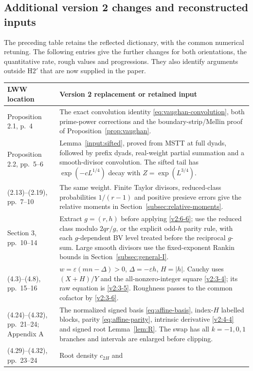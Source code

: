 \documentclass[11pt]{article}
\theoremstyle{definition}
\theoremstyle{remark}
\numberwithin{equation}{section}
\begin{document}
\subsection{Additional version 2 changes and reconstructed inputs}
The preceding table retains the reflected dictionary, with the
common numerical retuning. The following entries give the further
changes for both orientations, the quantitative rate, rough values
and progressions. They also identify arguments outside
$\mathrm H2'$ that are now supplied in the paper.
\small
\begin{longtable}{@{}>{\raggedright\arraybackslash}p{}>{\raggedright\arraybackslash}p{}@{}}
\toprule LWW location & Version 2 replacement or retained input\\\midrule
\endhead
Proposition 2.1, p.~4 & The exact convolution identity
\eqref{eq:vaughan-convolution}, both prime-power corrections and
the boundary-strip/Mellin proof of Proposition~\ref{prop:vaughan}.\\
Proposition 2.2, pp.~5--6 & Lemma~\ref{input:sifted}, proved from
MSTT at full dyads, followed by prefix dyads, real-weight partial
summation and a smooth-divisor convolution. The sifted tail has
$\exp(-cL^{1/4})$ decay with $Z=\exp(L^{3/4})$.\\
(2.13)--(2.19), pp.~7--10 & The same weight. Finite Taylor
divisors, reduced-class probabilities $1/(r-1)$ and positive
presieve errors give the relative moments in
Section~\ref{subsec:relative-moments}.\\
Section 3, pp.~10--14 & Extract $g=(r,h)$ before applying
\eqref{v2:6-6}; use the reduced class modulo $2qr/g$, or the
explicit odd-$h$ parity rule, with each $g$-dependent BV level
treated before the reciprocal $g$-sum. Large smooth divisors use
the fixed-exponent Rankin bounds in Section~\ref{subsec:general-I}.\\
(4.3)--(4.8), pp.~15--16 & $w=\varepsilon(mn-\Delta)>0$,
$\Delta=-\varepsilon h$, $H=|h|$. Cauchy uses
$(X+H)/Y$ and the all-nonzero-integer square
\eqref{v2:3-4}; its raw equation is \eqref{v2:3-5}.
Roughness passes to the common cofactor by \eqref{v2:3-6}.\\
(4.24)--(4.32), pp.~21--24; Appendix A & The normalized signed
basis \eqref{eq:affine-basis}, index-$H$ labelled blocks,
parity \eqref{eq:affine-parity}, intrinsic derivative
\eqref{v2:4-4} and signed root Lemma~\ref{lem:R}.
The swap has all $k=-1,0,1$ branches and intervals are enlarged
before clipping.\\
(4.29)--(4.32), pp.~23--24 & Root density $c_{2H}$ and

\end{longtable}
\end{document}
